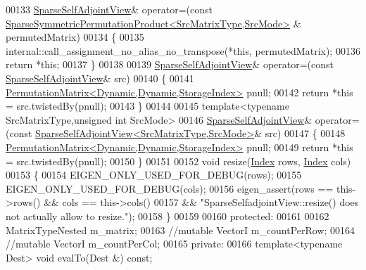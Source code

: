 \begin{DoxyCode}
00133     \hyperlink{group___sparse_core___module_class_eigen_1_1_sparse_self_adjoint_view}{SparseSelfAdjointView}& operator=(\textcolor{keyword}{const} 
      \hyperlink{class_eigen_1_1_sparse_symmetric_permutation_product}{SparseSymmetricPermutationProduct<SrcMatrixType,SrcMode>}
      & permutedMatrix)
00134     \{
00135       internal::call\_assignment\_no\_alias\_no\_transpose(*\textcolor{keyword}{this}, permutedMatrix);
00136       \textcolor{keywordflow}{return} *\textcolor{keyword}{this};
00137     \}
00138 
00139     \hyperlink{group___sparse_core___module_class_eigen_1_1_sparse_self_adjoint_view}{SparseSelfAdjointView}& operator=(\textcolor{keyword}{const} 
      \hyperlink{group___sparse_core___module_class_eigen_1_1_sparse_self_adjoint_view}{SparseSelfAdjointView}& src)
00140     \{
00141       \hyperlink{group___core___module}{PermutationMatrix<Dynamic,Dynamic,StorageIndex>} pnull;
00142       \textcolor{keywordflow}{return} *\textcolor{keyword}{this} = src.twistedBy(pnull);
00143     \}
00144 
00145     \textcolor{keyword}{template}<\textcolor{keyword}{typename} SrcMatrixType,\textcolor{keywordtype}{unsigned} \textcolor{keywordtype}{int} SrcMode>
00146     \hyperlink{group___sparse_core___module_class_eigen_1_1_sparse_self_adjoint_view}{SparseSelfAdjointView}& operator=(\textcolor{keyword}{const} 
      \hyperlink{group___sparse_core___module_class_eigen_1_1_sparse_self_adjoint_view}{SparseSelfAdjointView<SrcMatrixType,SrcMode>}& src)
00147     \{
00148       \hyperlink{group___core___module}{PermutationMatrix<Dynamic,Dynamic,StorageIndex>} pnull;
00149       \textcolor{keywordflow}{return} *\textcolor{keyword}{this} = src.twistedBy(pnull);
00150     \}
00151     
00152     \textcolor{keywordtype}{void} resize(\hyperlink{group___core___module_a554f30542cc2316add4b1ea0a492ff02}{Index} rows, \hyperlink{group___core___module_a554f30542cc2316add4b1ea0a492ff02}{Index} cols)
00153     \{
00154       EIGEN\_ONLY\_USED\_FOR\_DEBUG(rows);
00155       EIGEN\_ONLY\_USED\_FOR\_DEBUG(cols);
00156       eigen\_assert(rows == this->rows() && cols == this->cols()
00157                 && \textcolor{stringliteral}{"SparseSelfadjointView::resize() does not actually allow to resize."});
00158     \}
00159     
00160   \textcolor{keyword}{protected}:
00161 
00162     MatrixTypeNested m\_matrix;
00163     \textcolor{comment}{//mutable VectorI m\_countPerRow;}
00164     \textcolor{comment}{//mutable VectorI m\_countPerCol;}
00165   \textcolor{keyword}{private}:
00166     \textcolor{keyword}{template}<\textcolor{keyword}{typename} Dest> \textcolor{keywordtype}{void} evalTo(Dest &) \textcolor{keyword}{const};

\end{DoxyCode}
